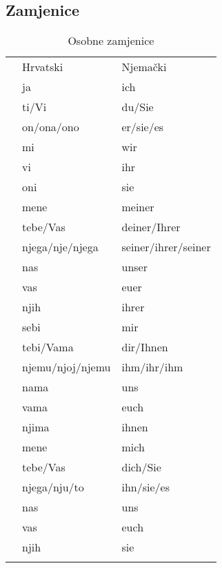 \documentclass[12pt,german]{article}
\makeatletter
\newenvironment{zamjenicetbl}[1]
{%
  \begin{table}[H]
    \caption{#1 zamjenice}
    \begin{tabular}{@{} lll @{}}
    \toprule
      & Hrvatski  &  Njemački \\
}{%
      \bottomrule
    \end{tabular}
  \end{table}}
\makeatother
\begin{document}
\begin{multicols}{2}
\section{Zamjenice}
\begin{zamjenicetbl}{Osobne}
  \zamjenicepadez{Nominativ}
    & ja         & ich \\
    & ti/Vi      & du/Sie \\
    & on/ona/ono & er/sie/es \\
    & mi         & wir \\
    & vi         & ihr \\
    & oni        & sie \\
  \endzamjenicepadez
  \zamjenicepadez{Genitiv}
    & mene         & meiner \\
    & tebe/Vas     & deiner/Ihrer \\
    & njega/nje/njega & seiner/ihrer/seiner \\
    & nas          & unser \\
    & vas          & euer \\
    & njih         & ihrer \\
  \endzamjenicepadez
  \zamjenicepadez{Dativ}
    & sebi             & mir \\
    & tebi/Vama        & dir/Ihnen \\
    & njemu/njoj/njemu & ihm/ihr/ihm \\
    & nama             & uns \\
    & vama             & euch \\
    & njima            & ihnen \\
  \endzamjenicepadez
  \zamjenicepadez{Akuzativ}
    & mene         & mich       \\
    & tebe/Vas     & dich/Sie   \\
    & njega/nju/to & ihn/sie/es \\
    & nas          & uns        \\
    & vas          & euch       \\
    & njih         & sie        \\
  \endzamjenicepadez
\end{zamjenicetbl}


\end{multicols}
\end{document}
